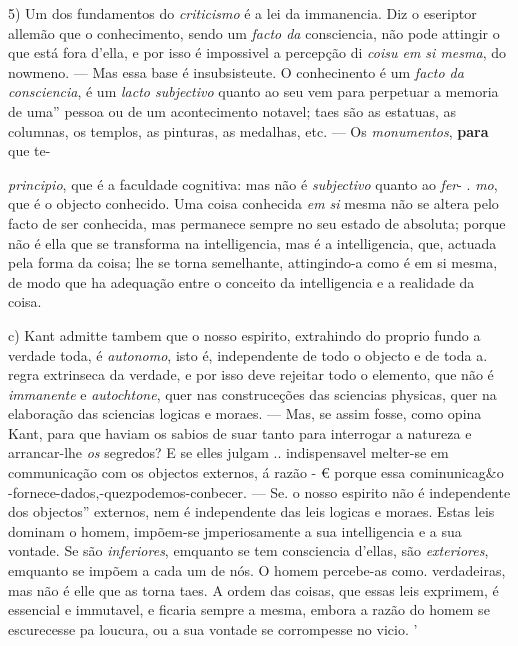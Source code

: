 5) Um dos fundamentos do \emph{criticismo} é a lei da immanencia. Diz o eseriptor allemão que o conhecimento, sendo um \emph{facto da} consciencia, não pode attingir o que está fora d'ella, e por isso é impossivel a percepção di \emph{coisu em si mesma}, do nowmeno. --- Mas essa base é insubsisteute. O conhecinento é um \emph{facto da consciencia}, é um \emph{lacto subjectivo} quanto ao seu   vem para perpetuar a memoria de uma” pessoa ou de um acontecimento notavel; taes são as estatuas, as columnas, os templos, as pinturas, as medalhas, etc. --- Os \emph{monumentos}, \textbf{para} que te-

\emph{principio}, que é a faculdade cognitiva: mas não é \emph{subjectivo} quanto ao \emph{fer}- . \emph{mo}, que é o objecto conhecido. Uma coisa conhecida \emph{em si} mesma não se altera pelo facto de ser conhecida, mas permanece sempre no seu estado de absoluta; porque não é ella que se transforma na intelligencia, mas é a intelligencia, que, actuada pela forma da coisa; lhe se torna semelhante, attingindo-a como é em si mesma, de modo que ha adequação entre o conceito da intelligencia e a realidade da coisa.

c) Kant admitte tambem que o nosso espirito, extrahindo do proprio fundo a verdade toda, é \emph{autonomo}, isto é, independente de todo o objecto e de toda a. regra extrinseca da verdade, e por isso deve rejeitar todo o elemento, que não é \emph{immanente} e \emph{autochtone}, quer nas construceções das sciencias physicas, quer na elaboração das sciencias logicas e moraes. --- Mas, se assim fosse, como opina Kant, para que haviam os sabios de suar tanto para interrogar a natureza e arrancar-lhe \emph{os} segredos? E se elles julgam .. indispensavel melter-se em communicação com os objectos externos, á razão - € porque essa cominunicag\&o -fornece-dados,-quezpodemos-conbecer. --- Se. o nosso espirito não é independente dos objectos” externos, nem é independente das leis logicas e moraes. Estas leis dominam o homem, impõem-se jmperiosamente a sua intelligencia e a sua vontade. Se são \emph{inferiores}, emquanto se tem consciencia d'ellas, são \emph{exteriores}, emquanto se impõem a cada um de nós. O homem percebe-as como. verdadeiras, mas não é elle que as torna taes. A ordem das coisas, que essas leis exprimem, é essencial e immutavel, e ficaria sempre a mesma, embora a razão do homem se escurecesse pa loucura, ou a sua vontade se corrompesse no vicio. '


